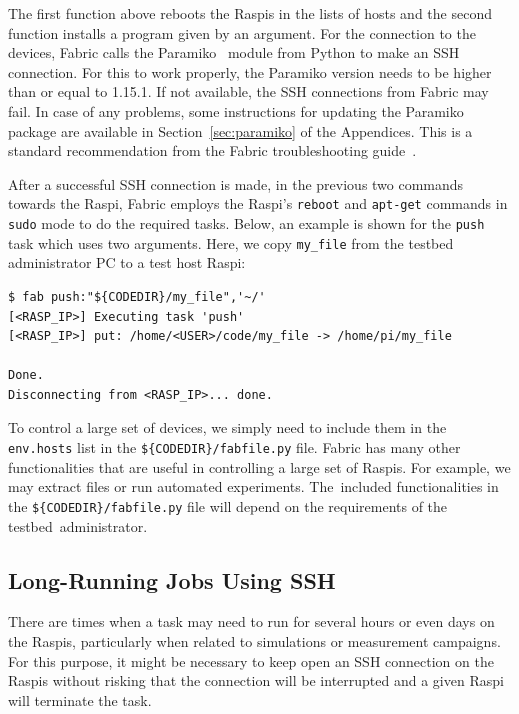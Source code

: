 \documentclass[electronics,article,accept,moreauthors,pdftex,10pt,a4paper]{mdpi}
\theoremstyle{mdpi}
\newcounter{ex}
\newcounter{re}
\theoremstyle{mdpidefinition}
\begin{document}
The first function above reboots the Raspis in the lists of hosts and
the second function installs a program given by an argument. For the
connection to the devices, Fabric calls the Paramiko~\cite{python_paramiko} module from Python
to make an SSH connection. For this to work properly, the Paramiko
version needs to be higher than or equal to 1.15.1. If not available,
the SSH connections from Fabric may fail. In case of any problems,
some instructions for updating the Paramiko package are available in
Section~\ref{sec:paramiko} of the Appendices. This is a standard recommendation
from the Fabric troubleshooting guide~\cite{2016fabricsupport}.

After a successful SSH
connection is made, in the previous two commands towards the Raspi,
Fabric employs the Raspi's \texttt{reboot} and \texttt{apt-get}
commands in \texttt{sudo} mode to do the required tasks. Below,
an example is shown for the \texttt{push} task which uses two arguments. Here, we
copy \texttt{my\_file} from the testbed administrator PC to a test
host Raspi:

\begin{lstlisting}[]
$ fab push:"${CODEDIR}/my_file",'~/'
[<RASP_IP>] Executing task 'push'
[<RASP_IP>] put: /home/<USER>/code/my_file -> /home/pi/my_file

Done.
Disconnecting from <RASP_IP>... done.
\end{lstlisting}
\FloatBarrier
\vspace{-5mm}

To control a large set of devices, we simply need to include them in the
\texttt{env.hosts} list in the \texttt{\$\{CODEDIR\}/fabfile.py} file.
Fabric has many other functionalities that are useful in controlling a
large set of Raspis. For example, we may extract files or run
automated experiments. The~included functionalities in the
\texttt{\$\{CODEDIR\}/fabfile.py} file will depend on the requirements of the
testbed~administrator.

\subsection{Long-Running Jobs Using SSH}
There are times when a task may need to run for several hours or even days
on the Raspis, particularly when related to simulations or measurement
campaigns. For this purpose, it might be necessary to keep open an SSH
connection on the Raspis without risking that the connection will
be interrupted and a given Raspi will terminate the task.
\end{document}
